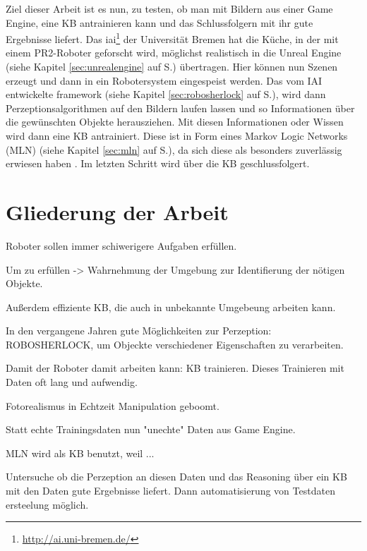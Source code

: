 Ziel dieser Arbeit ist es nun, zu testen, ob man mit Bildern aus einer Game Engine, eine KB antrainieren kann und das Schlussfolgern mit ihr gute Ergebnisse liefert. Das \gls{iai}\footnote{\url{http://ai.uni-bremen.de/}} der Universität Bremen hat die Küche, in der mit einem PR2-Roboter geforscht wird, möglichst realistisch in die Unreal Engine (siehe Kapitel \ref{sec:unrealengine} auf S.\pageref{sec:unrealengine}) übertragen. Hier können nun Szenen erzeugt und dann in ein Robotersystem eingespeist werden. Das vom IAI entwickelte \gls{framework} \robosherlock (siehe Kapitel \ref{sec:robosherlock} auf S.\pageref{sec:robosherlock}), wird dann Perzeptionsalgorithmen auf den Bildern laufen lassen und so Informationen über die gewünschten Objekte herausziehen. Mit diesen Informationen oder Wissen wird dann eine KB antrainiert. Diese ist in Form eines Markov Logic Networks (MLN) (siehe Kapitel \ref{sec:mln} auf S.\pageref{sec:mln}), da sich diese als besonders zuverlässig erwiesen haben . Im letzten Schritt wird über die KB geschlussfolgert.    


\section{Gliederung der Arbeit}
\label{sec:gliederung}



Roboter sollen immer schiwerigere Aufgaben erfüllen.

Um zu erfüllen -> Wahrnehmung der Umgebung zur Identifierung der nötigen Objekte.

Außerdem effiziente KB, die auch in unbekannte Umgebeung arbeiten kann. \par

In den vergangene Jahren gute Möglichkeiten zur Perzeption: ROBOSHERLOCK, um Objeckte verschiedener Eigenschaften zu verarbeiten.

Damit der Roboter damit arbeiten kann: KB trainieren.
Dieses Trainieren mit Daten oft lang und aufwendig.

Fotorealismus in Echtzeit Manipulation geboomt.

Statt echte Trainingsdaten nun "unechte" Daten aus Game Engine.

MLN wird als KB benutzt, weil ...

Untersuche ob die Perzeption an diesen Daten und das Reasoning über ein KB mit den Daten gute Ergebnisse liefert. Dann automatisierung von Testdaten ersteelung möglich. 
   

